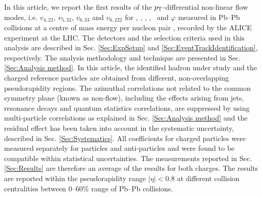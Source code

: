 
In this article, we report the first results of the $p_{\rm{T}}$-differential non-linear flow modes, i.e. $v_{4,22}$, $v_{5,32}$, $v_{6,33}$ and $v_{6,222}$ for \pion, \kaon, \Ks, \proton, \lambdas~and $\varphi$ measured in Pb--Pb collisions at a centre of mass energy per nucleon pair \sNN, recorded by the ALICE experiment \cite{Aamodt:2008zz} at the LHC. The detectors and the selection criteria used in  this analysis are described in Sec. \ref{Sec:ExpSetup} and \ref{Sec:EventTrackIdentification}, respectively. %
The analysis methodology and technique are presented in Sec. \ref{Sec:Analysis method}. In this article, the identified hadron under study and the charged reference particles are obtained from different, non-overlapping pseudorapidity regions. The azimuthal correlations not related to the common symmetry plane (known as non-flow), including the effects arising from jets, resonance decays and quantum statistics correlations, are suppressed by using multi-particle correlations as explained in Sec. \ref{Sec:Analysis method} and the residual effect has been taken into account in the systematic uncertainty, described in Sec. \ref{Sec:Systematics}. All coefficients for charged particles were measured separately for particles and anti-particles and were found to be compatible within statistical uncertainties. The measurements reported in Sec. \ref{Sec:Results} are therefore an average of the results for both charges. The results are reported within the pseudorapidity range $|\eta|<0.8$ at different collision centralities between 0--60\% range of Pb--Pb collisions. 







